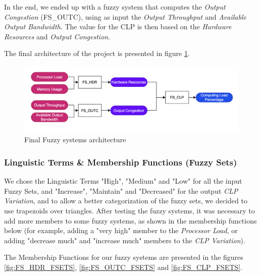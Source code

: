 In the end, we ended up with a fuzzy system that computes the \textit{Output Congestion} (FS\_OUTC), using as input the \textit{Output Throughput} and \textit{Available Output Bandwidth}.
The value for the CLP is then based on the \textit{Hardware Resources} and \textit{Output Congestion}.

The final architecture of the project is presented in figure \ref{fig:finalFS}.

\begin{figure}[!htb]
    \centering
    \includegraphics[width=\textwidth, height=\textheight, keepaspectratio]{images/fuzzy_systems_final.png}
    \caption{Final Fuzzy systems architecture}
    \label{fig:finalFS}
\end{figure}


\subsubsection{Linguistic Terms \& Membership Functions (Fuzzy Sets)}
We chose the Linguistic Terms "High", "Medium" and "Low" for all the input Fuzzy Sets, and "Increase", "Maintain" and "Decreased" for the output \textit{CLP Variation}, and to allow a better categorization of the fuzzy sets, we decided to use trapezoids over triangles.
After testing the fuzzy systems, it was necessary to add more members to some fuzzy systems, as shown in the membership functions below (for example, adding a "very high" member to the \textit{Processor Load}, or adding "decrease much" and "increase much" members to the \textit{CLP Variation}).

The Membership Functions for our fuzzy systems are presented in the figures \ref{fig:FS_HDR_FSETS}, \ref{fig:FS_OUTC_FSETS} and \ref{fig:FS_CLP_FSETS}.

